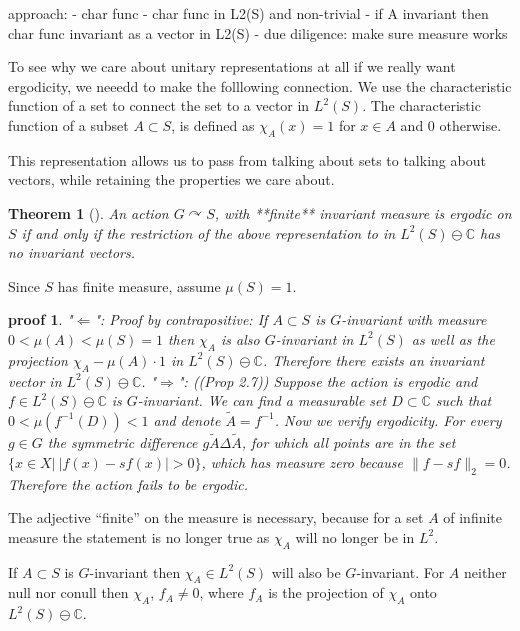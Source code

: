 \documentclass[
  12pt
]{article}
\theoremstyle{break}
\newtheorem{thm}{Theorem}
\theoremstyle{plain}
\newtheorem*{pf}{proof}
\begin{document}
  approach: - char func - char func in L2(S) and non-trivial - if A
  invariant then char func invariant as a vector in L2(S) - due diligence:
  make sure measure works

  To see why we care about unitary representations at all if we really
  want ergodicity, we neeedd to make the folllowing connection. We use the
  characteristic function of a set to connect the set to a vector in
  $L^2(S)$. The characteristic function of a subset $A\subset S$, is
  defined as $\chi_A(x) = 1$ for $x \in A$ and $0$ otherwise.

  This representation allows us to pass from talking about sets to talking
  about vectors, while retaining the properties we care about.

  \begin{thm}[]
    An action $G\curvearrowright S$, with **finite** invariant measure is ergodic
    on $S$ if and only if the restriction of the above representation to  in
    $L^2(S) \ominus \mathbb{C}$ has no invariant vectors.
  \end{thm}
    
  Since $S$ has finite measure, assume $\mu(S) =1$.

  \begin{pf}
  "$\Leftarrow$": Proof by contrapositive: If $A\subset S$ is $G$-invariant with
  measure $0 < \mu(A) < \mu(S) = 1$ then $\chi_A$ is also $G$-invariant in
  $L^2(S)$ as well as the projection $\chi_A - \mu(A)\cdot 1$ in $L^2(S)\ominus
  \mathbb{C}$. Therefore there exists an invariant vector in $L^2(S)\ominus
  \mathbb{C}$. "$\Rightarrow$": (\cite{Kerr16}(Prop 2.7)) Suppose the action is
  ergodic and $f\in L^2(S)\ominus \mathbb{C}$ is $G$-invariant. We can find a
  measurable set $D\subset \mathbb{C}$ such that $0<\mu(f^{-1}(D)) < 1$ and
  denote $\widetilde{A} = f^{-1}$. Now we verify ergodicity. For every $g\in G$
  the symmetric difference $g\widetilde{A} \Delta \widetilde{A}$, for which all
  points are in the set $\{x \in X | \ |f(x)-sf(x)| > 0\}$, which has measure
  zero because $\|f- sf\|_2=0$. Therefore the action fails to be ergodic.
  \end{pf}

  The adjective ``finite'' on the measure is necessary, because for a set
  $A$ of infinite measure the statement is no longer true as $\chi_A$
  will no longer be in $L^2$.

  If $A\subset S$ is $G$-invariant then $\chi_A\in L^2(S)$ will also
  be $G$-invariant. 
  For $A$ neither null nor conull then
  $\chi_A$, $f_A \neq 0$, where $f_A$ is the projection of
  $\chi_A$ onto $L^2(S) \ominus \mathbb{C}$.
\end{document}
